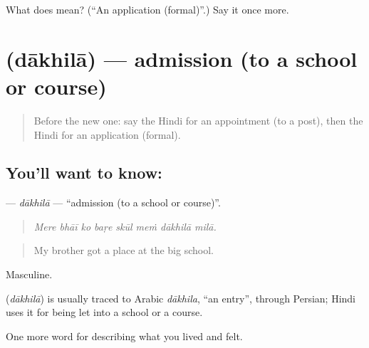 \begin{tcolorbox}[breakable,colback=teal!4,colframe=teal!35!black,title={Before you move on}]
What does  mean? (\textquotedblleft{}An application (formal)\textquotedblright{}.) Say it once more.
\end{tcolorbox}
\section[\texorpdfstring{\hi{दाख़िला} (dākhilā)}{दाख़िला (dākhilā)}]{ (dākhilā) — admission (to a school or course)}

\label{lesson:HI-C508-dakhila}



\begin{quote}
Before the new one: say the Hindi for an appointment (to a post), then the Hindi for an application (formal).
\end{quote}

\subsection*{You'll want to know: }
\textbf{} — \emph{dākhilā} — \textquotedblleft{}admission (to a school or course)\textquotedblright{}.

\begin{quote}
       
\end{quote}

\begin{quote}
\emph{Mere bhāī ko baṛe skūl meṁ dākhilā milā.}
\end{quote}

\begin{quote}
My brother got a place at the big school.
\end{quote}

Masculine.

\begin{cousinweb}
\textbf{} (\emph{dākhilā}) is usually traced to Arabic \emph{dākhila}, \textquotedblleft{}an entry\textquotedblright{}, through Persian; Hindi uses it for being let into a school or a course.
\end{cousinweb}

\begin{grammarlens}[title={What you've built}]
One more word for describing what you lived and felt.
\end{grammarlens}

